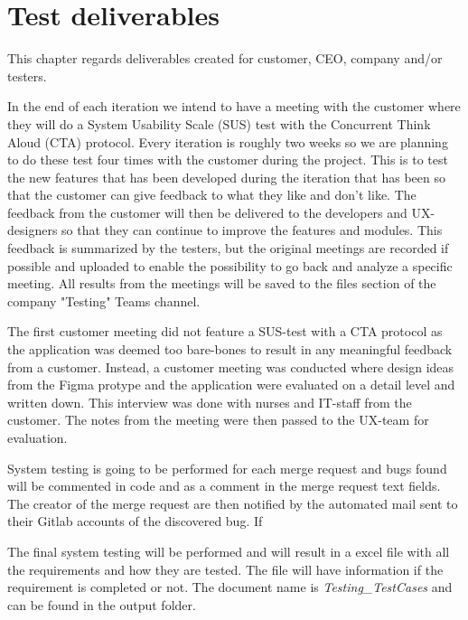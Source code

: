 \section{Test deliverables}
This chapter regards deliverables created for customer, CEO, company and/or testers.

\noindent In the end of each iteration we intend to have a meeting with the customer where they will do a System Usability Scale (SUS) test with the Concurrent Think Aloud (CTA) protocol. Every iteration is roughly two weeks so we are planning to do these test four times with the customer during the project. This is to test the new features that has been developed during the iteration that has been so that the customer can give feedback to what they like and don't like. The feedback from the customer will then be delivered to the developers and UX-designers so that they can continue to improve the features and modules. This feedback is summarized by the testers, but the original meetings are recorded if possible and uploaded to enable the possibility to go back and analyze a specific meeting. All results from the meetings will be saved to the files section of the company "Testing" Teams channel. \newline

\noindent The first customer meeting did not feature a SUS-test with a CTA protocol as the application was deemed too bare-bones to result in any meaningful feedback from a customer. Instead, a customer meeting was conducted where design ideas from the Figma protype and the application were evaluated on a detail level and written down. This interview was done with nurses and IT-staff from the customer. The notes from the meeting were then passed to the UX-team for evaluation.\newline

\noindent System testing is going to be performed for each merge request and bugs found will be commented in code and as a comment in the merge request text fields. The creator of the merge request are then notified by the automated mail sent to their Gitlab accounts of the discovered bug. If \newline

\noindent The final system testing will be performed and will result in a excel file with all the requirements and how they are tested. The file will have information if the requirement is completed or not. The document name is  \textit{Testing\_TestCases} and can be found in the output folder.   

